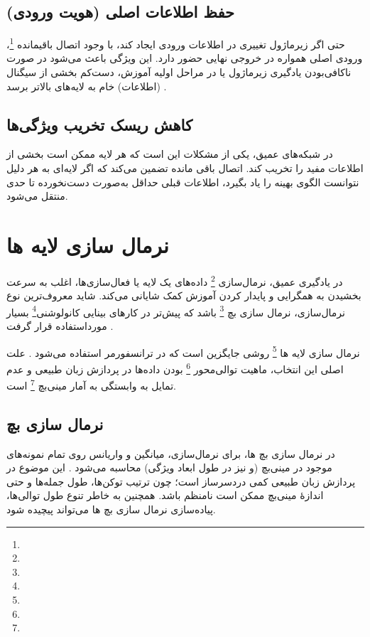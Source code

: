 \subsection*{حفظ اطلاعات اصلی (هویت ورودی)}
حتی اگر زیرماژول تغییری در اطلاعات ورودی ایجاد کند، با وجود اتصال باقیمانده \footnote{}، ورودی اصلی همواره در خروجی نهایی حضور دارد.
این ویژگی باعث می‌شود در صورت ناکافی‌بودن یادگیری زیرماژول یا در مراحل اولیه آموزش، دست‌کم بخشی از سیگنال (اطلاعات) خام به لایه‌های بالاتر برسد \cite{he2016deep,vaswani2017attention}.

\subsection*{کاهش ریسک تخریب ویژگی‌ها}
در شبکه‌های عمیق، یکی از مشکلات این است که هر لایه ممکن است بخشی از اطلاعات مفید را تخریب کند. اتصال باقی مانده تضمین می‌کند که اگر لایه‌ای به هر دلیل نتوانست الگوی بهینه را یاد بگیرد، اطلاعات قبلی حداقل به‌صورت دست‌نخورده تا حدی منتقل می‌شود.


\section{نرمال سازی لایه ها}

در یادگیری عمیق، نرمال‌سازی \footnote{} داده‌های یک لایه یا فعال‌سازی‌ها، اغلب به سرعت بخشیدن به همگرایی و پایدار کردن آموزش کمک شایانی می‌کند. شاید معروف‌ترین نوع نرمال‌سازی، نرمال سازی بچ \footnote{} باشد که پیش‌تر در کارهای بینایی کانولوشنی\footnote{} بسیار مورداستفاده قرار گرفت \cite{ioffe2015batch}.

نرمال سازی لایه ها \footnote{} روشی جایگزین است که در ترانسفورمر استفاده می‌شود \cite{ba2016layer,vaswani2017attention}. علت اصلی این انتخاب، ماهیت توالی‌محور \footnote{} بودن داده‌ها در پردازش زبان طبیعی و عدم تمایل به وابستگی به آمار مینی‌بچ \footnote{} است.


\subsection*{نرمال سازی بچ}
در نرمال سازی بچ ها، برای نرمال‌سازی، میانگین و واریانس روی تمام نمونه‌های موجود در مینی‌بچ (و نیز در طول ابعاد ویژگی) محاسبه می‌شود \cite{ioffe2015batch}.
این موضوع در پردازش زبان طبیعی کمی دردسرساز است؛ چون ترتیب توکن‌ها، طول جمله‌ها و حتی اندازهٔ مینی‌بچ ممکن است نامنظم باشد.
همچنین به خاطر تنوع طول توالی‌ها، پیاده‌سازی نرمال سازی بچ ها می‌تواند پیچیده شود.


